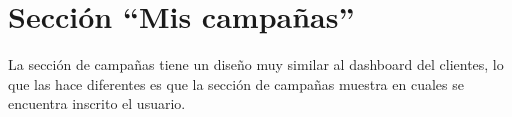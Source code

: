 \section{Sección ``Mis campañas''}
La sección de campañas tiene un diseño muy similar al dashboard del clientes, lo que las hace diferentes es que la sección de campañas muestra en cuales se encuentra inscrito el usuario.
    
    